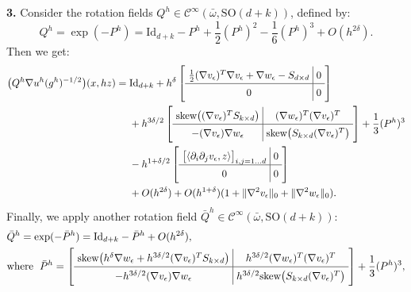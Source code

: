 \documentclass[reqno,twoside,11pt]{amsart}
\newcommand{\Id}{\mathrm{Id}}
\numberwithin{equation}{section}
\theoremstyle{plain}
\theoremstyle{definition}
\begin{document}
{\bf 3.}  Consider the rotation fields $Q^h\in\mathcal{C}^\infty(\bar \omega, \mathrm{SO}(d+k))$, defined by:
$$Q^h = \exp(-P^h) = \Id_{d+k} - P^h +\frac{1}{2}(P^h)^2-\frac{1}{6}(P^h)^3 + {O}(h^{2 \delta}). $$
Then we get:
\begin{equation*}
\arraycolsep=3.4pt\def\arraystretch{1.4}
\begin{split}
\big(Q^h \nabla u^h(g^h)^{-1/2}\big)(x, hz) = \; & \Id_{d+k} + h^\delta \left[\begin{array}{c|c} \frac{1}{2}(\nabla
    v_\epsilon)^T\nabla v_\epsilon+\nabla w_\epsilon -S_{d\times d} &  0 \\ \hline 0 &
0 \end{array}\right] \\ & + h^{3\delta/2} \left[\begin{array}{c|c}
\mbox{skew}\big((\nabla v_\epsilon)^TS_{k\times d}\big) &  (\nabla
w_\epsilon)^T(\nabla v_\epsilon)^T\\ \hline -  (\nabla v_\epsilon)\nabla
w_\epsilon & \mbox{skew}\big(S_{k\times d}(\nabla v_\epsilon)^T\big) \end{array}\right] +\frac{1}{3}(P^h)^{3} \\ & 
- h^{1+\delta/2}\left[\begin{array}{c|c} \big[\langle\partial_i\partial_j
    v_\epsilon, z\rangle\big]_{i,j=1\ldots d} &0\\ \hline 0&0\end{array}\right] \\ & 
+ {O}(h^{2\delta})  + {O}(h^{1+\delta} )(1+\|\nabla^2v_\epsilon\|_0+\|\nabla^2w_\epsilon\|_0).
\end{split}
\end{equation*}
Finally, we apply another rotation field $\bar Q^h\in \mathcal{C}^\infty(\bar \omega, \mathrm{SO}(d+k))$:
\begin{equation*}
\arraycolsep=3.4pt\def\arraystretch{1.4}
\begin{split}
& \bar Q^h = \exp(-\bar P^h) = \Id_{d+k} - \bar P^h + {O}(h^{2 \delta}), \\
& \mbox{where }\; \bar P^h = \left[\begin{array}{c|c}
    \mbox{skew}\big(h^\delta\nabla w_\epsilon  + h^{3\delta/2}(\nabla  v_\epsilon)^TS_{k\times d}\big)
&  h^{3\delta/2} (\nabla w_\epsilon)^T(\nabla v_\epsilon)^T \\ \hline - h^{3\delta/2} (\nabla v_\epsilon)\nabla w_\epsilon &
h^{3\delta/2} \mbox{skew}\big(S_{k\times d}(\nabla v_\epsilon)^T\big)\end{array}\right] + \frac{1}{3}(P^h)^3,
\end{split}
\end{equation*}
\end{document}
